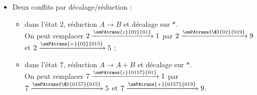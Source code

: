 \begin{corrections}
\begin{questions}
\begin{itemize}
    \item Deux conflits par décalage/réduction :
      \begin{itemize}
      \item dans l'état $2$, réduction $A\rightarrow B$ et décalage sur $*$. \\ On peut remplacer
        $2 \xrightarrow{\smPAtrans{\varepsilon}{02}{01}} 1$ par
        $2 \xrightarrow{\smPAtrans{\$}{02}{019}} 9$ et
        $2 \xrightarrow{\smPAtrans{+}{02}{015}} 5$ ;
      \item dans l'état $7$, réduction $A\rightarrow A+B$ et décalage sur $*$. \\ On peut remplacer
        $7 \xrightarrow{\smPAtrans{\varepsilon}{0157}{01}} 1$ par
        $7 \xrightarrow{\smPAtrans{\$}{0157}{015}} 5$ et
        $7 \xrightarrow{\smPAtrans{+}{0157}{019}} 9$.
      \end{itemize}
    \end{itemize}

  \end{questions}

\end{corrections}

\endgroup
\endinput
